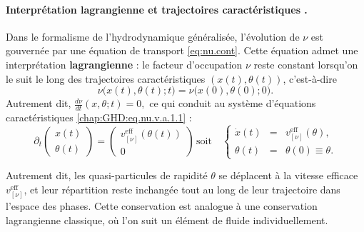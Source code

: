 \paragraph{Interprétation lagrangienne et trajectoires caractéristiques .}
Dans le formalisme de l’hydrodynamique généralisée, l’évolution de $\nu$ est gouvernée par une équation de transport  \eqref{eq:nu.cont}.  
Cette équation admet une interprétation \textbf{lagrangienne} : le facteur d’occupation $\nu$ reste constant lorsqu’on le suit le long des trajectoires caractéristiques $(x(t),\theta(t))$, c’est-à-dire
\begin{equation}\label{chap6:eq:traj_lagr_0}
\nu\big(x(t),\theta(t);t\big) = \nu\big(x(0),\theta(0);0\big).
\end{equation}
Autrement dit,
\(
\frac{d\nu}{dt}(x,\theta;t) = 0,
\)
ce qui conduit au système d’équations caractéristiques \eqref{chap:GHD:eq.nu.v.a.1.1} :
\begin{equation}
\label{chap6:eq:traj_lagr_1}
\partial_t \left( \begin{array}{c} x(t) \\ \theta(t) \end{array} \right)  =  \left( \begin{array}{c} v^{\mathrm{eff}}_{[\nu]}(\theta(t)) \\ 0 \end{array} \right)\, \mbox{soit} \quad \left\{ \begin{array}{rcl}
\displaystyle \dot x (t) & = & v^{\mathrm{eff}}_{[\nu]}(\theta), \\
\theta(t) & = & \theta(0) \equiv \theta.
\end{array} \right. 
\end{equation}

Autrement dit, les quasi-particules de rapidité $\theta$ se déplacent à la vitesse efficace $v^{\mathrm{eff}}_{[\nu]}$, et leur répartition reste inchangée tout au long de leur trajectoire dans l’espace des phases. Cette conservation est analogue à une conservation lagrangienne classique, où l’on suit un élément de fluide individuellement.


